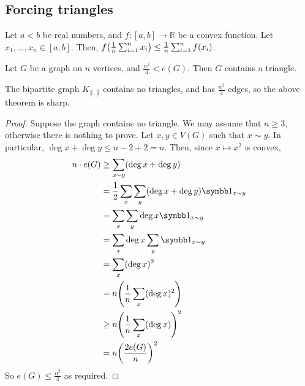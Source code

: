 \subsection{Forcing triangles}
\begin{proposition}[Jensen]
	Let \( a < b \) be real numbers, and \( f \colon [a,b] \to \mathbb R \) be a convex function.
	Let \( x_1, \dots, x_n \in [a,b] \).
	Then, \( f\qty(\frac{1}{n}\sum_{i=1}^n x_i) \leq \frac{1}{n} \sum_{i=1}^n f(x_i) \).
\end{proposition}
\begin{theorem}[Mantel]
	Let \( G \) be a graph on \( n \) vertices, and \( \frac{n^2}{4} < e(G) \).
	Then \( G \) contains a triangle.
\end{theorem}
\begin{remark}
	The bipartite graph \( K_{\frac{n}{2}, \frac{n}{2}} \) contains no triangles, and has \( \frac{n^2}{4} \) edges, so the above theorem is sharp.
\end{remark}
\begin{proof}
	Suppose the graph contains no triangle.
	We may assume that \( n \geq 3 \), otherwise there is nothing to prove.
	Let \( x, y \in V(G) \) such that \( x \sim y \).
	In particular, \( \deg x + \deg y \leq n - 2 + 2 = n \).
	Then, since \( x \mapsto x^2 \) is convex,
	\begin{align*}
		n\cdot e(G) &\geq \sum_{x \sim y} (\deg x + \deg y) \\
		&= \frac{1}{2} \sum_x \sum_y (\deg x + \deg y) \symbb 1_{x \sim y} \\
		&= \sum_x \sum_y \deg x \symbb 1_{x \sim y} \\
		&= \sum_x \deg x \sum_y \symbb 1_{x \sim y} \\
		&= \sum_x (\deg x)^2 \\
		&= n \qty( \frac{1}{n} \sum_x (\deg x)^2 ) \\
		&\geq n \qty( \frac{1}{n} \sum_x (\deg x) )^2 \\
		&= n \qty( \frac{2e(G)}{n} )^2
	\end{align*}
	So \( e(G) \leq \frac{n^2}{4} \) as required.
\end{proof}

